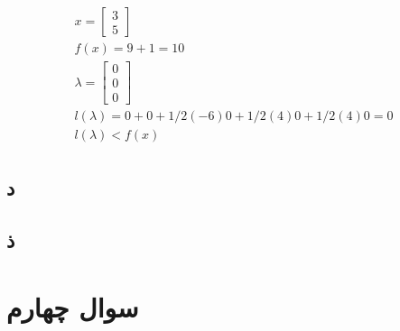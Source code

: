\documentclass[paper=a4, fontsize=11pt]{article}
\numberwithin{equation}{section} %
\numberwithin{figure}{section} %
\numberwithin{table}{section} %
\begin{document}
\begin{align}
	\begin{split}
		x =
		\left[
		\begin{array}{c}
			3 \\ 5
		\end{array}
		\right]\\
		f(x) = 9 + 1 = 10 \\
		\lambda =
		\left[
		\begin{array}{c}
			0 \\ 0 \\ 0
		\end{array}
		\right]\\
		l(\lambda) = 0 + 0 + 1/2(-6)0 + 1/2(4)0 + 1/2(4)0 = 0 \\
		l(\lambda) < f(x)
	\end{split}
\end{align}

\subsection{د}
\subsection{ذ}

\section{سوال چهارم}
\end{document}
